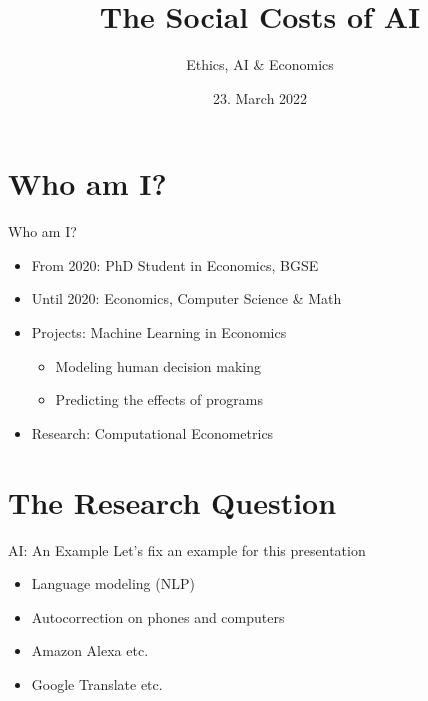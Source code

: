 \documentclass[serif, mathsansserif, aspectratio=169]{beamer}   %
\title{{\LARGE The Social Costs of AI}}
\subtitle{{\small Ethics, AI \& Economics}}
\author[Aimee van Wynsberghe \& Tim Mensinger \& Stefan H{\"o}se \& Markus Franke]
{%
   \texorpdfstring{
        \begin{columns}
            \column{.5\linewidth}
            \centering
            {{\large Aimee van Wynsberghe}\\\textcolor{bonngrey}{IWE}}
            \column{.5\linewidth}
            \centering
            {{\large Tim Mensinger}\\\textcolor{bonngrey}{Bonn Graduate School of Economics}}
        \end{columns}
        \vspace{0.5cm}
        \begin{columns}
            \column{.5\linewidth}
            \centering
            {{\large Stefan H{\"ose}}\\\textcolor{bonngrey}{DRZE}}
            \column{.5\linewidth}
            \centering
            {{\large Markus Franke}\\\textcolor{bonngrey}{IWE \& DRZE}}
        \end{columns}
   }
   {John Doe \& Jane Doe}
}
\date{23. March 2022}
\begin{document}
\begin{frame}
    \maketitle
\end{frame}

\begin{frame}
    \tableofcontents[hideallsubsections]
\end{frame}

\section{Who am I?}
\begin{frame}{Who am I?}
    \begin{itemize}
        \setlength\itemsep{1em}
        \item[\labelitem] From 2020: PhD Student in Economics, BGSE
        \item[\labelitem] Until 2020: Economics, Computer Science \& Math
        \item[\labelitem] Projects: Machine Learning in Economics
            \begin{itemize}
                \setlength\itemsep{0.5em}
                \item Modeling human decision making
                \item Predicting the effects of programs
            \end{itemize}
        \item[\labelitem] Research: Computational Econometrics
    \end{itemize}
\end{frame}


\section{The Research Question}
\begin{frame}{AI: An Example}
    \vspace{-1cm}
    Let's fix an example for this presentation
    \vspace{1cm}
    \begin{itemize}
        \setlength\itemsep{1em}
        \item[\labelitem] Language modeling (NLP)
        \item[\labelitem] Autocorrection on phones and computers
        \item[\labelitem] Amazon Alexa etc.
        \item[\labelitem] Google Translate etc.
    \end{itemize}
\end{frame}
\end{document}
